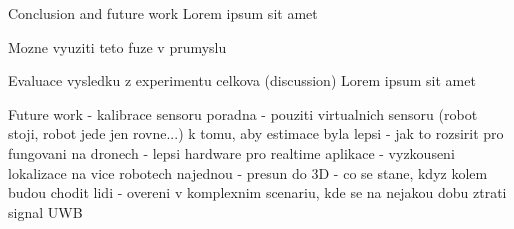 \chap Conclusion and future work
Lorem ipsum sit amet

\sec Mozne vyuziti teto fuze v prumyslu

\sec Evaluace vysledku z experimentu celkova (discussion)
Lorem ipsum sit amet


\sec Future work
 - kalibrace sensoru poradna
 - pouziti virtualnich sensoru (robot stoji, robot jede jen rovne...) k tomu, aby estimace byla lepsi
 - jak to rozsirit pro fungovani na dronech
 - lepsi hardware pro realtime aplikace
 - vyzkouseni lokalizace na vice robotech najednou
 - presun do 3D
 - co se stane, kdyz kolem budou chodit lidi
 - overeni v komplexnim scenariu, kde se na nejakou dobu ztrati signal UWB